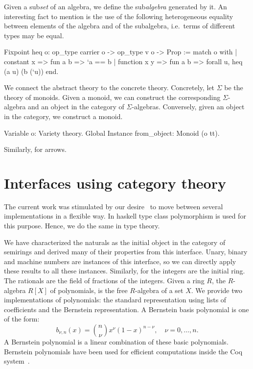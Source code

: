 \documentclass[a4paper,10pt, runningheads]{llncs}
\begin{document}
Given a sub\emph{set} of an algebra, we define the sub\emph{algebra} generated by it.
An interesting fact to mention is the use of the following heterogeneous equality between
elements of the algebra and of the subalgebra, i.e.\ terms of different types may be equal.
\begin{code}
  Fixpoint heq {o}: op_type carrier o -> op_type v o -> Prop :=
    match o with
    | constant x => fun a b => `a == b
    | function x y => fun a b => forall u, heq (a u) (b (`u))
    end.
\end{code}


We connect the abstract theory to the concrete theory. Concretely, let $\Sigma$ be the theory
of monoids. Given a monoid, we can construct the corresponding $\Sigma$-algebra and an
object in the category of $\Sigma$-algebras. Conversely, given an object in the category, we
construct a monoid.
\begin{code}
 Variable o: Variety theory.
 Global Instance from_object: Monoid (o tt).
\end{code}
Similarly, for arrows.



\section{Interfaces using category theory}\label{interfaces}\label{modul}
The current work was stimulated by our desire~\cite{Riemann} to move between several
implementations in a flexible way. In haskell type class polymorphism is used for this purpose.
Hence, we do the same in type theory.

We have characterized the naturals as the initial object in the category of semirings and derived
many of their properties from this interface. Unary, binary and machine numbers are
instances of this interface, so we can directly apply these results to all these instances.
Similarly, for the integers are the initial ring. The rationals are the field of fractions of the
integers. 
Given a ring $R$, the $R$-algebra $R[X]$ of polynomials, is the free $R$-algebra of a set $X$.
We provide two implementations of polynomials: the
standard representation using lists of coefficients and the Bernstein representation. A Bernstein
basis polynomial is one of the form:
\[b_{\nu,n}(x) = {n \choose \nu} x^{\nu} \left( 1 - x \right)^{n - \nu}, \quad \nu = 0, \ldots, n.\]
A Bernstein polynomial is a linear combination of these basic polynomials. Bernstein polynomials
have been used for efficient computations inside the Coq system~\cite{ZumkellerPhD}.
\end{document}
